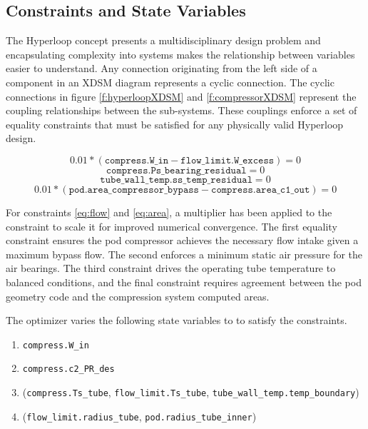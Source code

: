 \documentclass[heading.tex]{subfiles}
\begin{document}
\subsection{Constraints and State Variables}

The Hyperloop concept presents a multidisciplinary design problem and encapsulating complexity into systems makes the relationship
between variables easier to understand.  Any connection originating from the left side of a component in an XDSM diagram represents a
cyclic connection. The cyclic connections in figure \ref{f:hyperloopXDSM}  and \ref{f:compressorXDSM} represent the coupling relationships
between the sub-systems. These couplings enforce a set of equality constraints that must be satisfied for any physically valid Hyperloop design. 

\begin{equation} \label{eq:flow}
	0.01*(\texttt{compress.W\_in} - \texttt{flow\_limit.W\_excess}) = 0
\end{equation}
\begin{equation} \label{eq:bearing}
	\texttt{compress.Ps\_bearing\_residual} = 0
\end{equation}
\begin{equation} \label{eq:temp}
	\texttt{tube\_wall\_temp.ss\_temp\_residual} = 0
\end{equation}
\begin{equation} \label{eq:area}
	0.01*(\texttt{pod.area\_compressor\_bypass} - \texttt{compress.area\_c1\_out}) = 0
\end{equation}

For constraints \ref{eq:flow} and \ref{eq:area}, a multiplier has been applied to the constraint to scale it for improved numerical convergence.
The first equality constraint ensures the pod compressor achieves the necessary flow intake given a maximum bypass flow.
The second enforces a minimum static air pressure for the air bearings. The third constraint drives the operating tube temperature to balanced conditions,
and the final constraint requires agreement between the pod geometry code and the compression system computed areas.

The optimizer varies  the following state variables to to satisfy the constraints. 

\begin{enumerate}
\item \texttt{compress.W\_in}
\item \texttt{compress.c2\_PR\_des}
\item (\texttt{compress.Ts\_tube}, \texttt{flow\_limit.Ts\_tube}, \texttt{tube\_wall\_temp.temp\_boundary}) \label{Temp}
\item (\texttt{flow\_limit.radius\_tube}, \texttt{pod.radius\_tube\_inner}) \label{Radius}
\end{enumerate}
\end{document}
